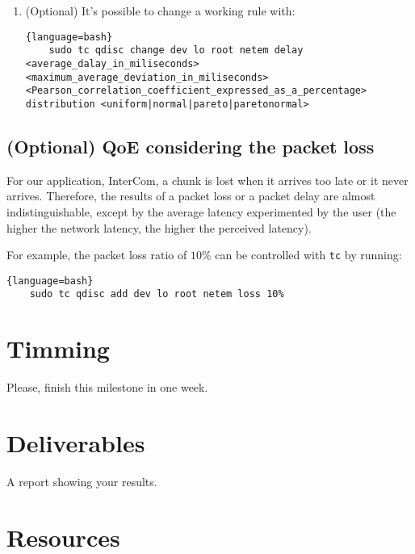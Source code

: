 \begin{enumerate}
  \begin{lstlisting}{language=bash}
    tc qdisc show
  \end{lstlisting}

\item (Optional) It's possible to change a working rule with:

  \begin{lstlisting}{language=bash}
    sudo tc qdisc change dev lo root netem delay <average_dalay_in_miliseconds> <maximum_average_deviation_in_miliseconds> <Pearson_correlation_coefficient_expressed_as_a_percentage> distribution <uniform|normal|pareto|paretonormal>
  \end{lstlisting}
  
\end{enumerate}

\subsection{(Optional) QoE considering the packet loss}

For our application, InterCom, a chunk is lost when it arrives too
late or it never arrives. Therefore, the results of a packet loss or a
packet delay are almost indistinguishable, except by the average
latency experimented by the user (the higher the network latency, the
higher the perceived latency).

For example, the packet loss ratio of $10\%$ can be controlled with
\texttt{tc} by running:

  \begin{lstlisting}{language=bash}
    sudo tc qdisc add dev lo root netem loss 10%
  \end{lstlisting}

\section{Timming}

Please, finish this milestone in one week.

\section{Deliverables}

A report showing your results.

\section{Resources}


